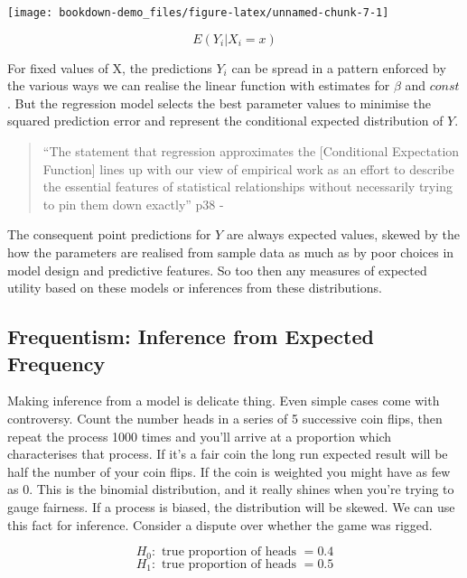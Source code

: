 \documentclass[]{tufte-book}
\theoremstyle{definition}
\theoremstyle{definition}
\theoremstyle{definition}
\theoremstyle{remark}
\begin{document}
\texttt{[image: bookdown-demo\_files/figure-latex/unnamed-chunk-7-1]}

\[ E(Y_{i} | X_{i} = x )\]

For fixed values of X, the predictions \(Y_{i}\) can be spread in a pattern enforced by the various ways we can realise the linear function with estimates for \(\beta\) and \(const\). But the regression model selects the best parameter values to minimise the squared prediction error and represent the conditional expected distribution of \(Y\).

\begin{quote}
``The statement that regression approximates the {[}Conditional Expectation Function{]} lines up with our view of empirical work as an effort to describe the essential features of statistical relationships without necessarily trying to pin them down exactly'' p38 - \citep{angrist_mostly_2008}
\end{quote}

The consequent point predictions for \(Y\) are always expected values, skewed by the how the parameters are realised from sample data as much as by poor choices in model design and predictive features. So too then any measures of expected utility based on these models or inferences from these distributions.

\hypertarget{frequentism-inference-from-expected-frequency}{%
\subsection{Frequentism: Inference from Expected Frequency}\label{frequentism-inference-from-expected-frequency}}

Making inference from a model is delicate thing. Even simple cases come with controversy. Count the number heads in a series of 5 successive coin flips, then repeat the process 1000 times and you'll arrive at a proportion which characterises that process. If it's a fair coin the long run expected result will be half the number of your coin flips. If the coin is weighted you might have as few as 0. This is the binomial distribution, and it really shines when you're trying to gauge fairness. If a process is biased, the distribution will be skewed. We can use this fact for inference. Consider a dispute over whether the game was rigged.

\[ H_0 : \text{ true proportion of heads } = 0.4  \] \[ H_1 : \text{ true proportion of heads } =  0.5 \]
\end{document}
